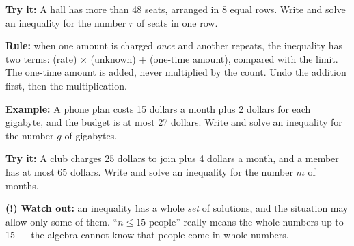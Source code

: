 \documentclass[12pt]{article}
\begin{document}
\begin{tryitbox}
\textbf{Try it:} \quad A hall has more than 48 seats, arranged in 8 equal rows.
Write and solve an inequality for the number $r$ of seats in one row.\\[2pt]
\end{tryitbox}


\begin{formulabox}
\textbf{Rule:} when one amount is charged \emph{once} and another repeats, the
inequality has two terms: (rate) $\times$ (unknown) $+$ (one-time amount),
compared with the limit. The one-time amount is added, never multiplied by the
count. Undo the addition first, then the multiplication.
\end{formulabox}

\begin{examplebox}
\textbf{Example:} \quad A phone plan costs 15 dollars a month plus 2 dollars for
each gigabyte, and the budget is at most 27 dollars. Write and solve an
inequality for the number $g$ of gigabytes.
\end{examplebox}

\begin{tryitbox}
\textbf{Try it:} \quad A club charges 25 dollars to join plus 4 dollars a month,
and a member has at most 65 dollars. Write and solve an inequality for the
number $m$ of months.\\[2pt]
\end{tryitbox}

\begin{watchoutbox}
\textbf{(!) Watch out:} an inequality has a whole \emph{set} of solutions, and
the situation may allow only some of them. ``$n \le 15$ people'' really means
the whole numbers up to 15 --- the algebra cannot know that people come in whole
numbers.
\end{watchoutbox}
\end{document}
